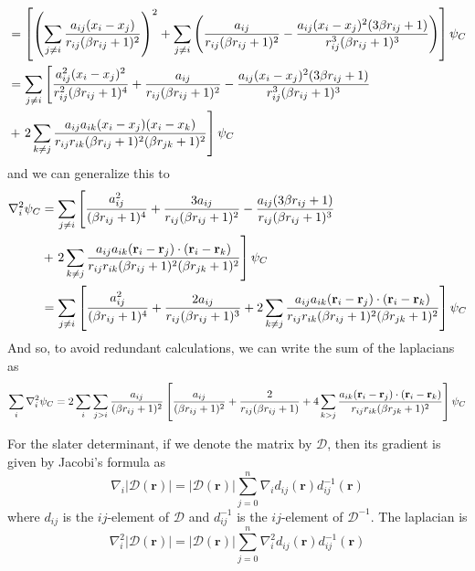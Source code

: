 \documentclass[aps,prc,twocolumn,floatfix]{revtex4}
\def\rvec{\textbf{r}}
\begin{document}
\begin{appendices}
\begin{widetext}
\begin{align}
 & = \left[ \left( \sum_{j \ne i} { a_{ij}(x_i - x_j) \over r_{ij}(\beta r_{ij} + 1)^2} \right)^2  + \sum_{j \ne i}\left(  { a_{ij} \over r_{ij}(\beta r_{ij} + 1)^2} - {a_{ij}(x_i-x_j)^2(3\beta r_{ij} + 1) \over r_{ij}^3(\beta r_{ij} + 1)^3 } \right)  \right] \psi_C \\
 & = \sum_{j\ne i}\left[  { a_{ij}^2(x_i - x_j)^2 \over r_{ij}^2(\beta r_{ij} + 1)^4} + { a_{ij} \over r_{ij}(\beta r_{ij} + 1)^2} - {a_{ij}(x_i-x_j)^2(3\beta r_{ij} + 1) \over r_{ij}^3(\beta r_{ij} + 1)^3}\right.\\
 & + \left.2\sum_{k \ne j} {a_{ij}a_{ik} (x_i-x_j)(x_i - x_k) \over r_{ij}r_{ik}(\beta r_{ij} + 1)^2(\beta r_{jk} + 1)^2  } \right]\psi_C
\end{align}
and we can generalize this to 
\begin{align}
 \nabla_i^2 \psi_C &= \sum_{j\ne i}\left[  { a_{ij}^2 \over (\beta r_{ij} + 1)^4} + { 3a_{ij} \over r_{ij}(\beta r_{ij} + 1)^2} - {a_{ij}(3\beta r_{ij} + 1) \over r_{ij}(\beta r_{ij} + 1)^3}\right.\\
 & + \left.2\sum_{k \ne j} {a_{ij}a_{ik} (\rvec_i-\rvec_j)\cdot(\rvec_i - \rvec_k) \over r_{ij}r_{ik}(\beta r_{ij} + 1)^2(\beta r_{jk} + 1)^2  } \right]\psi_C \\
 &= \sum_{j\ne i}\left[  { a_{ij}^2 \over (\beta r_{ij} + 1)^4} +  {2a_{ij} \over r_{ij}(\beta r_{ij} + 1)^3} + 2\sum_{k \ne j} {a_{ij}a_{ik} (\rvec_i-\rvec_j)\cdot(\rvec_i - \rvec_k) \over r_{ij}r_{ik}(\beta r_{ij} + 1)^2(\beta r_{jk} + 1)^2  } \right]\psi_C
\end{align}
And so, to avoid redundant calculations, we can write the sum of the laplacians as
\begin{equation}
 \sum_{i} \nabla_i^2 \psi_C = 2 \sum_i \sum_{j>i}  {a_{ij}\over (\beta r_{ij} + 1)^2}\left[  { a_{ij} \over (\beta r_{ij} + 1)^2} +  {2 \over r_{ij}(\beta r_{ij} + 1)} + 4\sum_{k > j} {a_{ik} (\rvec_i-\rvec_j)\cdot(\rvec_i - \rvec_k) \over r_{ij}r_{ik}(\beta r_{jk} + 1)^2  } \right]\psi_C
\end{equation}
 \end{widetext}
For the slater determinant, if we denote the matrix by $\mathcal{D}$, then its gradient is given by Jacobi's formula as
\begin{equation}
 \nabla_i |\mathcal{D}(\rvec)| = |\mathcal{D}(\rvec)| \sum_{j=0}^n \nabla_i d_{ij}(\rvec) d_{ij}^{-1}(\rvec)
\end{equation}
where $d_{ij}$ is the $ij$-element of $\mathcal{D}$ and $d_{ij}^{-1}$ is the $ij$-element of $\mathcal{D}^{-1}$. The laplacian is
\begin{equation}
 \nabla_i^2 |\mathcal{D}(\rvec)| = |\mathcal{D}(\rvec)| \sum_{j=0}^n \nabla_i^2 d_{ij}(\rvec) d_{ij}^{-1}(\rvec)
\end{equation}




\end{appendices}
\end{document}
